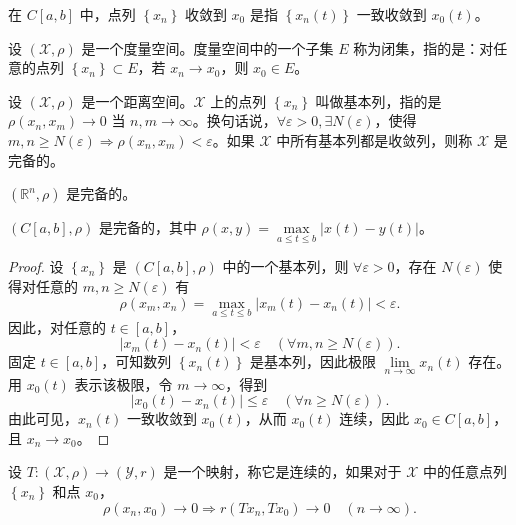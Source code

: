 \documentclass[lang=cn,newtx,10pt,scheme=chinese,thmcnt=chapter]{elegantbook}
\begin{document}
\begin{note}在 $C[a, b]$ 中，点列 $\left\{x_n\right\}$ 收敛到 $x_0$ 是指 $\left\{x_n(t)\right\}$ 一致收敛到 $x_0(t)$。
\end{note}
\begin{definition}
设 $(\mathscr{X}, \rho)$ 是一个度量空间。度量空间中的一个子集 $E$ 称为闭集，指的是：对任意的点列 $\left\{x_n\right\} \subset E$，若 $x_n \rightarrow x_0$，则 $x_0 \in E$。
\end{definition}

\begin{definition}
设 $(\mathscr{X}, \rho)$ 是一个距离空间。$\mathscr{X}$ 上的点列 $\left\{x_n\right\}$ 叫做基本列，指的是 $\rho\left(x_n, x_m\right) \rightarrow 0$ 当 $n, m \rightarrow \infty$。换句话说，$\forall \varepsilon > 0, \exists N(\varepsilon)$，使得 $m, n \geqslant N(\varepsilon) \Rightarrow \rho\left(x_n, x_m\right) < \varepsilon$。如果 $\mathscr{X}$ 中所有基本列都是收敛列，则称 $\mathscr{X}$ 是完备的。
\end{definition}

\begin{example}
$(\mathbb{R}^n, \rho)$ 是完备的。
\end{example}

\begin{example}
$(C[a, b], \rho)$ 是完备的，其中 $\rho(x, y) = \max\limits_{a \leqslant t \leqslant b} |x(t) - y(t)|$。
\end{example}

\begin{proof}设 $\left\{x_n\right\}$ 是 $(C[a, b], \rho)$ 中的一个基本列，则 $\forall \varepsilon > 0$，存在 $N(\varepsilon)$ 使得对任意的 $m, n \geqslant N(\varepsilon)$ 有
\begin{equation*}
\rho(x_m, x_n) = \max_{a \leqslant t \leqslant b} |x_m(t) - x_n(t)| < \varepsilon .
\end{equation*}
因此，对任意的 $t \in [a, b]$，
\begin{equation*}
|x_m(t) - x_n(t)| < \varepsilon \quad (\forall m, n \geqslant N(\varepsilon)) .
\end{equation*}
固定 $t \in [a, b]$，可知数列 $\left\{x_n(t)\right\}$ 是基本列，因此极限 $\lim\limits_{n \rightarrow \infty} x_n(t)$ 存在。用 $x_0(t)$ 表示该极限，令 $m \rightarrow \infty$，得到
\begin{equation*}
|x_0(t) - x_n(t)| \leqslant \varepsilon \quad (\forall n \geqslant N(\varepsilon)) .
\end{equation*}
由此可见，$x_n(t)$ 一致收敛到 $x_0(t)$，从而 $x_0(t)$ 连续，因此 $x_0 \in C[a, b]$，且 $x_n \rightarrow x_0$。
\end{proof}
\begin{definition}
设 $T:(\mathscr{X}, \rho) \rightarrow (\mathscr{Y}, r)$ 是一个映射，称它是连续的，如果对于 $\mathscr{X}$ 中的任意点列 $\left\{x_n\right\}$ 和点 $x_0$，
\begin{equation*}
\rho\left(x_n, x_0\right) \rightarrow 0 \Rightarrow r\left(T x_n, T x_0\right) \rightarrow 0 \quad (n \rightarrow \infty) .
\end{equation*}
\end{definition}
\end{document}
